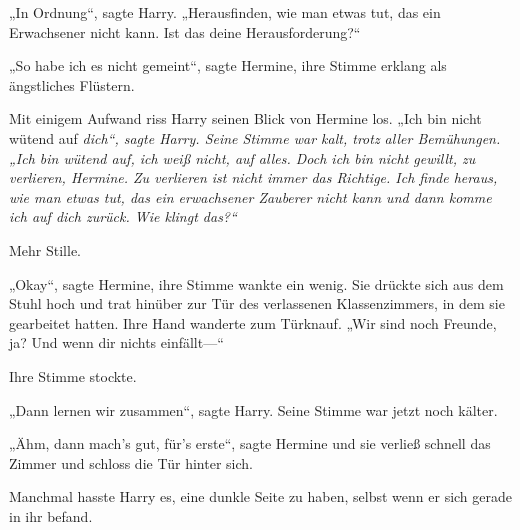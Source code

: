 „In Ordnung“, sagte Harry. „Herausfinden, wie man etwas tut, das ein Erwachsener nicht kann. Ist das deine Herausforderung?“

„So habe ich es nicht gemeint“, sagte Hermine, ihre Stimme erklang als ängstliches Flüstern.

Mit einigem Aufwand riss Harry seinen Blick von Hermine los. „Ich bin nicht wütend auf \emph{dich“, sagte Harry. Seine Stimme war kalt, trotz aller Bemühungen. „Ich bin wütend auf, ich weiß nicht, auf alles. Doch ich bin nicht gewillt, zu verlieren, Hermine. Zu verlieren ist nicht immer das Richtige. Ich finde heraus, wie man etwas tut, das ein erwachsener Zauberer nicht kann und dann komme ich auf dich zurück. Wie klingt das?“}

Mehr Stille.

„Okay“, sagte Hermine, ihre Stimme wankte ein wenig. Sie drückte sich aus dem Stuhl hoch und trat hinüber zur Tür des verlassenen Klassenzimmers, in dem sie gearbeitet hatten. Ihre Hand wanderte zum Türknauf. „Wir sind noch Freunde, ja? Und wenn dir nichts einfällt—“

Ihre Stimme stockte.

„Dann lernen wir zusammen“, sagte Harry. Seine Stimme war jetzt noch kälter.

„Ähm, dann mach’s gut, für’s erste“, sagte Hermine und sie verließ schnell das Zimmer und schloss die Tür hinter sich.

Manchmal hasste Harry es, eine dunkle Seite zu haben, selbst wenn er sich gerade in ihr befand.

